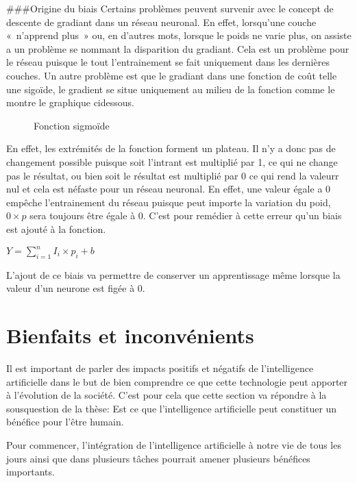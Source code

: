 \documentclass[letterpaper,10pt,french]{sphinxmanual}
\begin{document}
\#\#\#Origine du biais
Certains problèmes peuvent survenir avec le concept de descente de gradiant dans un réseau neuronal.
En effet, lorsqu’une couche « n’apprend plus » ou, en d’autres mots, lorsque le poids ne varie plus,
on assiste a un problème se nommant la disparition du gradiant. Cela est un problème pour le réseau puisque
le tout l’entrainement se fait uniquement dans les dernières couches. Un autre problème est que le gradiant
dans une fonction de coût telle une sigoïde, le gradient se situe uniquement au milieu de la fonction comme
le montre le graphique ci\sphinxhyphen{}dessous.

\begin{figure}[htbp]
\centering
\capstart

\noindent{}
\caption{Fonction sigmoïde}\label{\detokenize{training:tanh}}\end{figure}

En effet, les extrémités de la fonction forment un plateau. Il n’y a donc pas de changement
possible puisque soit l’intrant est multiplié par 1, ce qui ne change pas le résultat, ou bien
soit le résultat est multiplié par 0 ce qui rend la valeurr nul et cela est néfaste pour un réseau neuronal.
En effet, une valeur égale a 0 empêche l’entrainement du réseau puisque peut importe la variation
du poid, \(0\times p\) sera toujours être égale à 0. C’est pour remédier à cette erreur qu’un biais est ajouté
à la fonction.

\(Y =\sum_{i=1}^{n} I_i \times p_i + b\)

L’ajout de ce biais va permettre de conserver un apprentissage même lorsque la valeur d’un neurone est figée à 0.


\section{Bienfaits et inconvénients}
\label{\detokenize{bienfaits_et_inconv_xe9nients:bienfaits-et-inconvenients}}\label{\detokenize{bienfaits_et_inconv_xe9nients::doc}}
Il est important de parler des impacts positifs et négatifs de l’intelligence
artificielle dans le but de bien comprendre ce que cette technologie peut apporter
à l’évolution de la société. C’est pour cela que cette section va répondre à la
sous\sphinxhyphen{}question de la thèse: Est\sphinxhyphen{} ce que l’intelligence artificielle peut constituer
un bénéfice pour l’être humain.

Pour commencer, l’intégration de l’intelligence artificielle à notre vie de tous
les jours ainsi que dans plusieurs tâches pourrait amener plusieurs bénéfices
importants.
\end{document}
